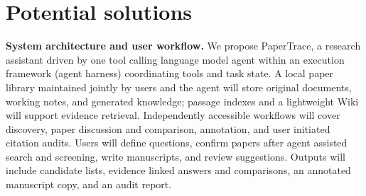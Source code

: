 \documentclass{article}
\begin{document}
\section{Potential solutions}

\noindent\textbf{System architecture and user workflow.} We propose PaperTrace, a research assistant driven by one tool calling language model agent within an execution framework (agent harness) coordinating tools and task state. A local paper library maintained jointly by users and the agent will store original documents, working notes, and generated knowledge; passage indexes and a lightweight Wiki will support evidence retrieval. Independently accessible workflows will cover discovery, paper discussion and comparison, annotation, and user initiated citation audits. Users will define questions, confirm papers after agent assisted search and screening, write manuscripts, and review suggestions. Outputs will include candidate lists, evidence linked answers and comparisons, an annotated manuscript copy, and an audit report.
\end{document}

